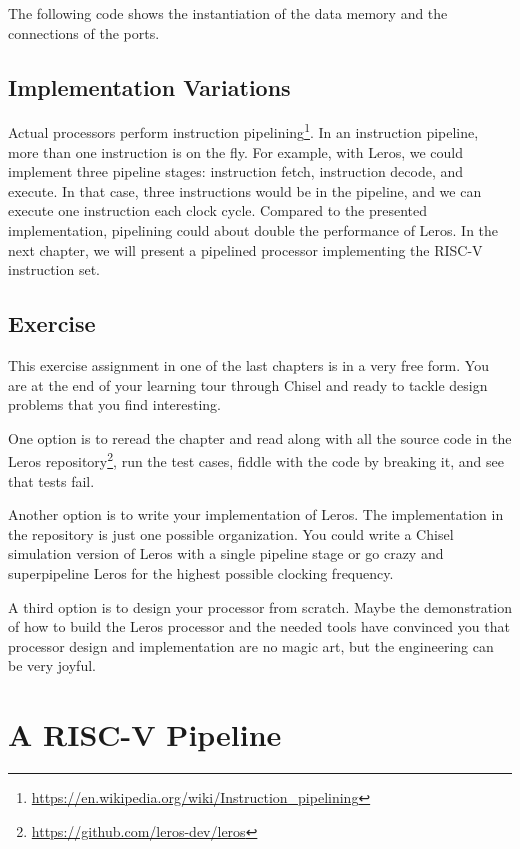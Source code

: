 \documentclass[%
    10pt,
    headinclude, footinclude=false,
    openright, %
    notitlepage,
    cleardoublepage=empty,
    headsepline,
    numbers=noenddot,
    bibliography=totoc, index=totoc,
    ]{scrbook}
\newcommand{\myref}[2]{\href{#1}{#2}}
\renewcommand{\myref}[2]{{#2}{\footnote{\url{#1}}}}
\begin{document}

The following code shows the instantiation of the data memory and the connections
of the ports. 



\section{Implementation Variations}

Actual processors perform
\myref{https://en.wikipedia.org/wiki/Instruction_pipelining}{instruction pipelining}.
In an instruction pipeline, more than one instruction is on the fly. For example,
with Leros, we could implement three pipeline stages: instruction fetch,
instruction decode, and execute. In that case, three instructions would
be in the pipeline, and we can execute one instruction each clock cycle.
Compared to the presented implementation, pipelining could about double
the performance of Leros.
In the next chapter, we will present a pipelined processor implementing the
RISC-V instruction set.

\section{Exercise}

This exercise assignment in one of the last chapters is in a very free form. You are at the end
of your learning tour through Chisel and ready to tackle design problems that
you find interesting.

One option is to reread the chapter and read along with all the source code in the
\myref{https://github.com/leros-dev/leros}{Leros repository}, run the test cases,
fiddle with the code by breaking it, and see that tests fail.

Another option is to write your implementation of Leros.
The implementation in the repository is just one possible organization.
You could write a Chisel simulation version of Leros with a single pipeline stage
or go crazy and superpipeline Leros for the highest possible clocking frequency.

A third option is to design your processor from scratch. Maybe the demonstration of
how to build the Leros processor and the needed tools have convinced you that processor
design and implementation are no magic art, but the engineering can be very joyful.

\chapter{A RISC-V Pipeline}
\end{document}
